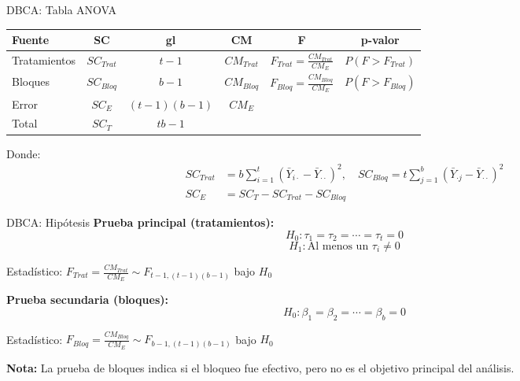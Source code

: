 \documentclass[aspectratio=169]{beamer}
\begin{document}
\begin{frame}{DBCA: Tabla ANOVA}
\begin{table}
\centering
\begin{tabular}{lccccc}
\toprule
\textbf{Fuente} & \textbf{SC} & \textbf{gl} & \textbf{CM} & \textbf{F} & \textbf{p-valor} \\
\midrule
Tratamientos & $SC_{Trat}$ & $t-1$ & $CM_{Trat}$ & $F_{Trat} = \frac{CM_{Trat}}{CM_E}$ & $P(F > F_{Trat})$ \\[0.2cm]
Bloques & $SC_{Bloq}$ & $b-1$ & $CM_{Bloq}$ & $F_{Bloq} = \frac{CM_{Bloq}}{CM_E}$ & $P(F > F_{Bloq})$ \\[0.2cm]
Error & $SC_E$ & $(t-1)(b-1)$ & $CM_E$ & & \\[0.2cm]
\midrule
Total & $SC_T$ & $tb-1$ & & & \\
\bottomrule
\end{tabular}
\end{table}

\vspace{0.3cm}
Donde:
\begin{align*}
SC_{Trat} &= b\sum_{i=1}^{t} (\bar{Y}_{i\cdot} - \bar{Y}_{\cdot\cdot})^2, \quad
SC_{Bloq} = t\sum_{j=1}^{b} (\bar{Y}_{\cdot j} - \bar{Y}_{\cdot\cdot})^2 \\
SC_E &= SC_T - SC_{Trat} - SC_{Bloq}
\end{align*}
\end{frame}

\begin{frame}{DBCA: Hipótesis}
\textbf{Prueba principal (tratamientos):}
$$H_0: \tau_1 = \tau_2 = \cdots = \tau_t = 0$$
$$H_1: \text{Al menos un } \tau_i \neq 0$$

Estadístico: $F_{Trat} = \frac{CM_{Trat}}{CM_E} \sim F_{t-1, (t-1)(b-1)}$ bajo $H_0$

\vspace{0.3cm}
\textbf{Prueba secundaria (bloques):}
$$H_0: \beta_1 = \beta_2 = \cdots = \beta_b = 0$$

Estadístico: $F_{Bloq} = \frac{CM_{Bloq}}{CM_E} \sim F_{b-1, (t-1)(b-1)}$ bajo $H_0$

\vspace{0.3cm}
\textbf{Nota:} La prueba de bloques indica si el bloqueo fue efectivo, pero no es el objetivo principal del análisis.
\end{frame}
\end{document}
